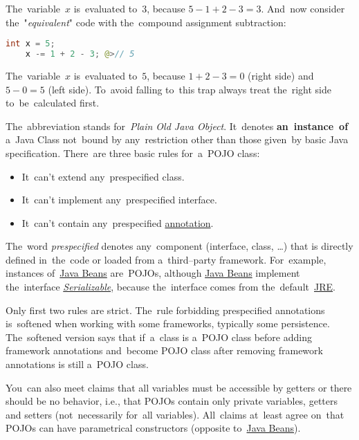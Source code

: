 \noindent The~variable~$x$ is~evaluated to~$3$, because $5-1+2-3=3$. And~now consider the~"\textit{equivalent}" code with the~compound assignment subtraction:
\begin{lstlisting}[language=Java, frame=no]
    int x = 5;
    x -= 1 + 2 - 3; @>// 5
\end{lstlisting}

\noindent The~variable~$x$ is~evaluated to~$5$, because $1+2-3=0$ (right side) and~$5-0=5$ (left side). To~avoid falling to~this trap always treat the~right side to~be~calculated first.

\label{serialization}

\label{pojo}
The~abbreviation stands for~\textit{Plain Old Java Object}. It~denotes \textbf{an~instance~of} a~Java Class not~bound by any~restriction other than those given~by basic Java specification. There~are three basic rules for~a~POJO class:
\begin{itemize}
    \item It~can't extend any~prespecified class.
    \item It~can't implement any~prespecified interface.
    \item It~can't contain any~prespecified \hyperref[javaannotation]{annotation}.
\end{itemize}
\noindent The~word \textit{prespecified} denotes any~component (interface, class, \dots) that is directly defined in~the~code or loaded from a~third--party framework. For~example, instances of~\hyperref[javabeans]{Java Beans} are~POJOs, although \hyperref[javabeans]{Java Beans} implement the~interface \hyperref[serialization]{\textit{Serializable}}, because the~interface comes from the~default~\hyperref[jdkjrejvm]{JRE}.

\warning Only first two rules are strict. The~rule forbidding prespecified annotations is~softened when working with some frameworks, typically some persistence. The~softened version says that if~a~class is a~POJO class before adding framework annotations and~become POJO class after removing framework annotations is still a~POJO class.

\warning You~can also meet claims that all variables must be accessible by getters or there should be no behavior, i.e., that POJOs contain only private variables, getters and setters (not~necessarily for~all variables). All~claims at~least agree on~that POJOs can have parametrical constructors (opposite to~\hyperref[javabeans]{Java Beans}).

